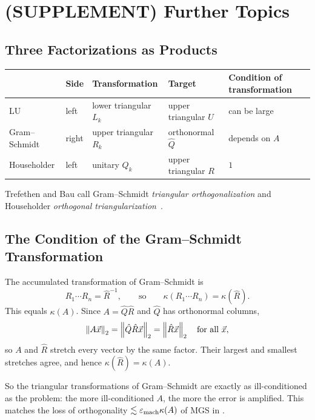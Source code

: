 \section{(SUPPLEMENT) Further Topics}
\label{sec:hh-supp}
\subsection{Three Factorizations as Products}

\begin{center}
\begin{tabular}{lllll}
  \toprule
  & Side & Transformation & Target & Condition of transformation \\
  \midrule
  LU & left & lower triangular $L_k$ & upper triangular $U$ & can be large \\
  Gram--Schmidt & right & upper triangular $R_k$ & orthonormal $\hat{Q}$ & depends on $A$ \\
  Householder & left & unitary $Q_k$ & upper triangular $R$ & $1$ \\
  \bottomrule
\end{tabular}
\end{center}
Trefethen and Bau call Gram--Schmidt \emph{triangular orthogonalization} and Householder \emph{orthogonal triangularization}~\cite[Lectures 8 and 10]{TB}.

\subsection{The Condition of the Gram--Schmidt Transformation}

The accumulated transformation of Gram--Schmidt is
\begin{equation*}
  R_1 \cdots R_n = \hat{R}^{-1}, \qquad\text{so}\qquad \kappa(R_1 \cdots R_n) = \kappa(\hat{R}).
\end{equation*}
This equals $\kappa(A)$. Since $A = \hat{Q}\hat{R}$ and $\hat{Q}$ has orthonormal columns,
\begin{equation*}
  \left\lVert A\vec{x} \right\rVert_2 = \left\lVert \hat{Q}\hat{R}\vec{x} \right\rVert_2 = \left\lVert \hat{R}\vec{x} \right\rVert_2 \quad\text{for all } \vec{x},
\end{equation*}
so $A$ and $\hat{R}$ stretch every vector by the same factor. Their largest and smallest stretches agree, and hence $\kappa(\hat{R}) = \kappa(A)$.

So the triangular transformations of Gram--Schmidt are exactly as ill-conditioned as the problem: the more ill-conditioned $A$, the more the error is amplified. This matches the loss of orthogonality $\lesssim \varepsilon_{\mathrm{mach}}\kappa(A)$ of MGS in .

